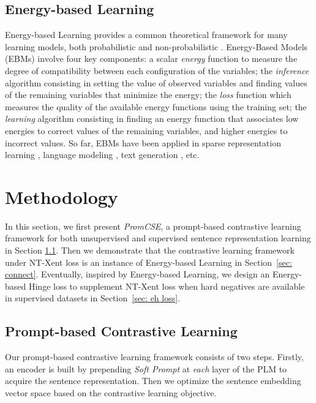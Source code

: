 \documentclass[11pt]{article}
\begin{document}
\subsection{Energy-based Learning}
Energy-based Learning provides a common theoretical framework for many learning models, both probabilistic and non-probabilistic \cite{DBLP:journals/neco/Hinton02, lecun2006tutorial, DBLP:journals/jmlr/RanzatoBCL07}. Energy-Based Models (EBMs) involve four key components: a scalar \textit{energy} function to measure the degree of compatibility between each configuration of the variables; the \textit{inference} algorithm consisting in setting the value of observed variables and finding values of the remaining variables that minimize the energy; the \textit{loss} function which measures the quality of the available energy functions using the training set; the \textit{learning} algorithm consisting in finding an energy function that associates low energies to correct values of the remaining variables, and higher energies to incorrect values. So far, EBMs have been applied in sparse representation learning \cite{DBLP:conf/nips/RanzatoPCL06}, language modeling \cite{DBLP:conf/icml/MnihT12}, text generation \cite{DBLP:conf/iclr/DengBOSR20}, etc.




\section{Methodology}

In this section, we first present \emph{PromCSE}, a prompt-based contrastive learning framework for both unsupervised and supervised sentence representation learning in Section \ref{sec: promcse}.
Then we demonstrate that the contrastive learning framework under NT-Xent loss is an instance of Energy-based Learning in Section~\ref{sec: connect}. Eventually, inspired by Energy-based Learning, we design an Energy-based Hinge loss to supplement NT-Xent loss when hard negatives are available in supervised datasets in Section~\ref{sec: eh loss}.

\subsection{Prompt-based Contrastive Learning}
\label{sec: promcse}
Our prompt-based contrastive learning framework consists of two steps. Firstly, an encoder is built by prepending \emph{Soft Prompt} at \emph{each} layer of the PLM to acquire the sentence representation. Then we optimize the sentence embedding vector space based on the contrastive learning objective.
\end{document}

